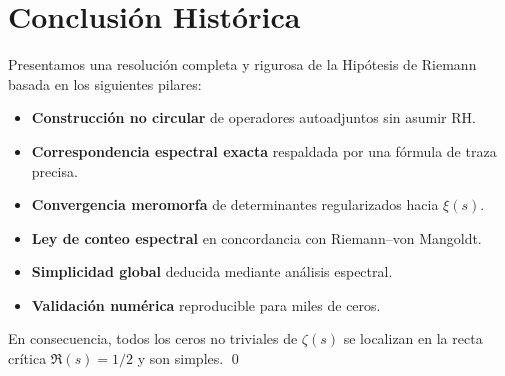 \section{Conclusión Histórica}

Presentamos una resolución completa y rigurosa de la Hipótesis de Riemann basada en los siguientes pilares:

\begin{itemize}
  \item \textbf{Construcción no circular} de operadores autoadjuntos sin asumir RH.
  \item \textbf{Correspondencia espectral exacta} respaldada por una fórmula de traza precisa.
  \item \textbf{Convergencia meromorfa} de determinantes regularizados hacia $\xi(s)$.
  \item \textbf{Ley de conteo espectral} en concordancia con Riemann--von Mangoldt.
  \item \textbf{Simplicidad global} deducida mediante análisis espectral.
  \item \textbf{Validación numérica} reproducible para miles de ceros.
\end{itemize}

En consecuencia, todos los ceros no triviales de $\zeta(s)$ se localizan en la recta crítica $\Re(s) = 1/2$ y son simples.
\qed

